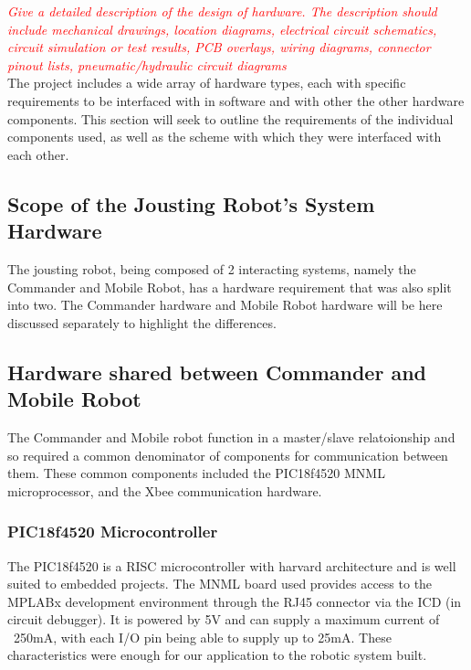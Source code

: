 \documentclass[11pt,a4paper]{article}
\begin{document}
  \textcolor{red}
  {
  \textit{Give a detailed description of the design of hardware. The description should include mechanical drawings, location diagrams, electrical circuit schematics, circuit simulation or test results, PCB overlays, wiring diagrams, connector pinout lists, pneumatic/hydraulic circuit diagrams}
  }
  \\The project includes a wide array of hardware types, each with specific requirements to be interfaced with in software and with other the other hardware components. This section will seek to outline the requirements of the individual components used, as well as the scheme with which they were interfaced with each other.

  \subsection{Scope of the Jousting Robot's System Hardware}
    The jousting robot, being composed of 2 interacting systems, namely the Commander and Mobile Robot, has a hardware requirement that was also split into two.
    The Commander hardware and Mobile Robot hardware will be here discussed separately to highlight the differences.
  \subsection{Hardware shared between Commander and Mobile Robot}
    The Commander and Mobile robot function in a master/slave relatoionship and so required a common denominator of components for communication between them. These common components included the PIC18f4520 MNML microprocessor, and the Xbee communication hardware.
    \subsubsection{PIC18f4520 Microcontroller}
    The PIC18f4520 is a RISC microcontroller with harvard architecture and is well suited to embedded projects. The MNML board used provides access to the MPLABx development environment through the RJ45 connector via the ICD (in circuit debugger). It is powered by 5V and can supply a maximum current of ~250mA, with each I/O pin being able to supply up to 25mA. These characteristics were enough for our application to the robotic system built.
\end{document}
